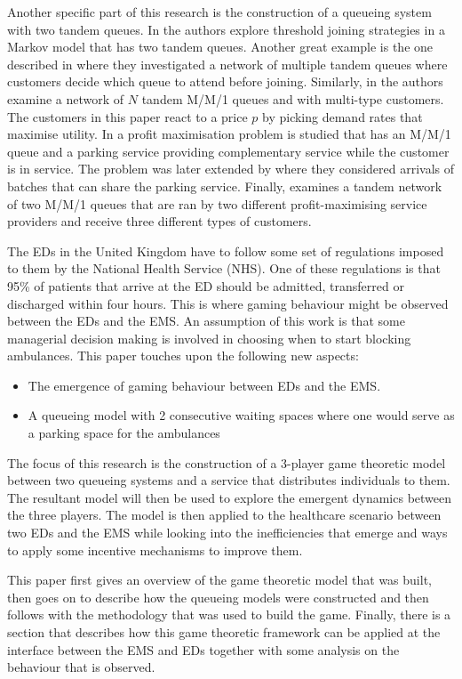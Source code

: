Another specific part of this research is the construction of a queueing system
with two tandem queues.
In \cite{d2015pure} the authors explore threshold joining strategies in a 
Markov model that has two tandem queues.
Another great example is the one described in \cite{burnetas2013customer}
where they investigated a network of multiple tandem queues where customers 
decide which queue to attend before joining.
Similarly, in \cite{bacsar2002stackelberg} the authors examine a network of 
\(N\) tandem M/M/1 queues and with multi-type customers. 
The customers in this paper react to a price \(p\) by picking demand rates that 
maximise utility.
In \cite{veltman2005equilibrium} a profit maximisation problem is studied that
has an M/M/1 queue and a parking service providing complementary service while
the customer is in service. 
The problem was later extended by \cite{sun2009equilibrium} where they 
considered arrivals of batches that can share the parking service.
Finally, \cite{afeche2007decentralized} examines a tandem network of two M/M/1 
queues that are ran by two different profit-maximising service providers and 
receive three different types of customers.

The EDs in the United Kingdom have to follow some set of regulations imposed to 
them by the National Health Service (NHS).
One of these regulations is that 95\% of patients that arrive at the ED should 
be admitted, transferred or discharged within four hours.
This is where gaming behaviour might be observed between the EDs and the EMS.
An assumption of this work is that some managerial decision making is involved
in choosing when to start blocking ambulances.
This paper touches upon the following new aspects:
\begin{itemize}
    \item The emergence of gaming behaviour between EDs and the EMS.
    \item A queueing model with 2 consecutive waiting spaces where one would 
    serve as a parking space for the ambulances
\end{itemize}
The focus of this research is the construction of a 3-player game theoretic 
model between two queueing systems and a service that distributes individuals
to them. 
The resultant model will then be used to explore the emergent dynamics between 
the three players.
The model is then applied to the healthcare scenario between two EDs and the 
EMS while looking into the inefficiencies that emerge and ways to apply some 
incentive mechanisms to improve them.

This paper first gives an overview of the game theoretic model that was built, 
then goes on to describe how the queueing models were constructed and then 
follows with the methodology that was used to build the game.
Finally, there is a section that describes how this game theoretic framework
can be applied at the interface between the EMS and EDs together with some 
analysis on the behaviour that is observed.


